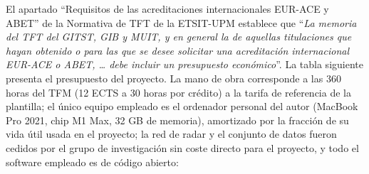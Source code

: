 El apartado ``Requisitos de las acreditaciones internacionales EUR-ACE y ABET'' de la Normativa de TFT de la ETSIT-UPM establece que ``\textit{La memoria del TFT del GITST, GIB y MUIT, y en general la de aquellas titulaciones que hayan obtenido o para las que se desee solicitar una acreditación internacional EUR-ACE o ABET, … debe incluir un presupuesto económico}''. La tabla siguiente presenta el presupuesto del proyecto. La mano de obra
corresponde a las 360 horas del TFM (12 ECTS a 30 horas por crédito) a la
tarifa de referencia de la plantilla; el único equipo empleado es el
ordenador personal del autor (MacBook Pro 2021, chip M1 Max, 32 GB de
memoria), amortizado por la fracción de su vida útil usada en el proyecto;
la red de radar y el conjunto de datos fueron cedidos por el grupo de
investigación sin coste directo para el proyecto, y todo el software
empleado es de código abierto:

